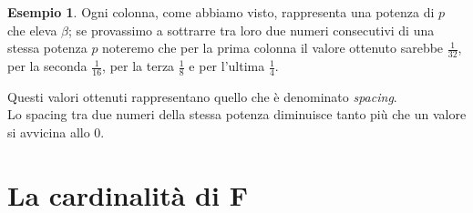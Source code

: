 \documentclass[12pt, a4paper]{book}
\theoremstyle{definition}
\newtheorem{exmp}{Esempio}[section]
\begin{document}
\begin{flushleft}
\begin{exmp}
Ogni colonna, come abbiamo visto, rappresenta una potenza di $p$ che eleva $\beta$; se provassimo a sottrarre tra loro due numeri consecutivi di una stessa potenza $p$ noteremo che per la prima colonna il valore ottenuto sarebbe $\frac{1}{32}$, per la seconda $\frac{1}{16}$, per la terza $ \frac{1}{8}$ e per l'ultima $\frac{1}{4}$.

Questi valori ottenuti rappresentano quello che è denominato \textit{spacing}. \\
Lo spacing tra due numeri della stessa potenza diminuisce tanto più che un valore si avvicina allo 0. 
\end{exmp} 

\end{flushleft}

\section{La cardinalità di F}
\end{document}
